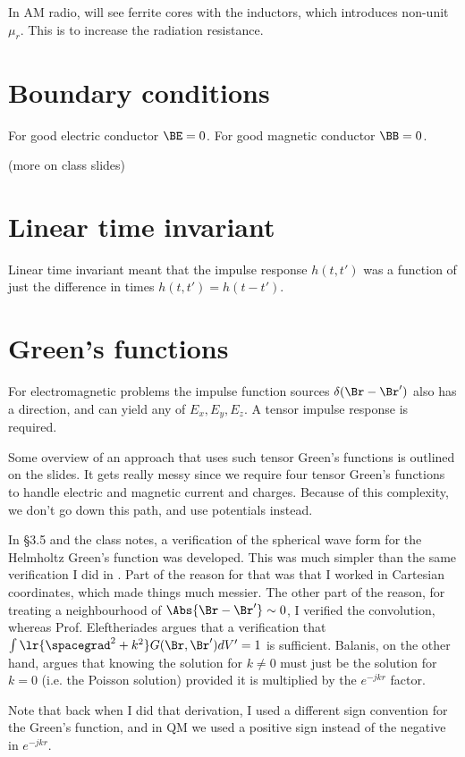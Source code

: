 In AM radio, will see ferrite cores with the inductors, which introduces non-unit \( \mu_r \).  This is to increase the radiation resistance.

\section{Boundary conditions}

For good electric conductor \( \BE = 0 \).
For good magnetic conductor \( \BB = 0 \).

(more on class slides)

\section{Linear time invariant}

Linear time invariant meant that the impulse response \( h(t,t') \) was a function of just the difference in times \( h(t,t') = h(t-t') \).

\section{Green's functions}

For electromagnetic problems the impulse function sources \( \delta(\Br - \Br') \) also has a direction, and can yield any of \( E_x, E_y, E_z \).  A tensor impulse response is required.

Some overview of an approach that uses such tensor Green's functions is outlined on the slides.  It gets really messy since we require four tensor Green's functions to handle electric and magnetic current and charges.  Because of this complexity, we don't go down this path, and use potentials instead.

In \S 3.5 \citep{balanis2005antenna} and the class notes, a verification of the spherical wave form for the Helmholtz Green's function was developed.  This was much simpler than the same verification I did in \citep{phy456:helmoltzGreens}.  Part of the reason for that was that I worked in Cartesian coordinates, which made things much messier.  The other part of the reason, for treating a neighbourhood of \( \Abs{\Br - \Br'} \sim 0 \), I verified the convolution, whereas Prof. Eleftheriades argues that a verification that \( \int \lr{\spacegrad^2 + k^2} G(\Br, \Br') dV' = 1\) is sufficient.  Balanis, on the other hand, argues that knowing the solution for \( k \ne 0 \) must just be the solution for \( k = 0 \) (i.e. the Poisson solution) provided it is multiplied by the \( e^{-j k r} \) factor.

Note that back when I did that derivation, I used a different sign convention for the Green's function, and in QM we used a positive sign instead of the negative in \( e^{-j k r } \).

%
%

